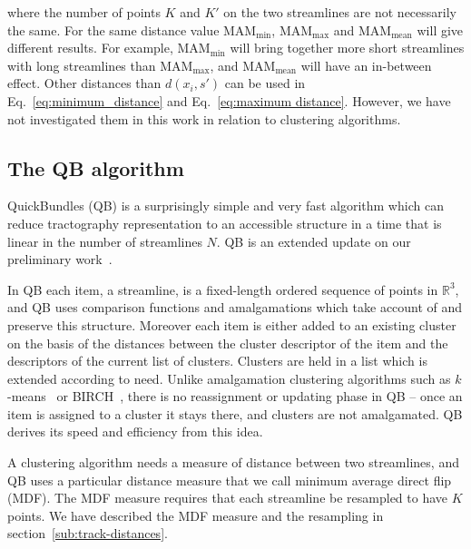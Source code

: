 \documentclass{bioinfo}
\begin{document}
\begin{methods}
\noindent
where the number of points $K$ and $K'$ on the two streamlines are not
necessarily the same. For the same distance value
$\textrm{MAM}_{\textrm{min}}$, $\textrm{MAM}_{\textrm{max}}$ and
$\textrm{MAM}_{\textrm{mean}}$ will give different results. For example,
$\textrm{MAM}_{\textrm{min}}$ will bring together more short streamlines
with long streamlines than $\textrm{MAM}_{\textrm{max}}$, and
$\textrm{MAM}_{\textrm{mean}}$ will have an in-between effect.  Other
distances than $d(x_{i},s')$ can be used in
Eq.~\ref{eq:minimum_distance} and Eq.~\ref{eq:maximum distance}.
However, we have not investigated them in this work in relation to
clustering algorithms.

\subsection{The QB algorithm\label{sub:QB-description}}

QuickBundles (QB) is a surprisingly simple and very fast algorithm which
can reduce tractography representation to an accessible structure in a
time that is linear in the number of streamlines $N$. QB is an extended
update on our preliminary work~\citet{EGMB10}.

In QB each item, a streamline, is a fixed-length ordered sequence of
points in $\mathbb{R}^{3}$, and QB uses comparison functions and
amalgamations which take account of and preserve this structure.
Moreover each item is either added to an existing cluster on the basis
of the distances between the cluster descriptor of the item and the
descriptors of the current list of clusters. Clusters are held in a list
which is extended according to need. Unlike amalgamation clustering
algorithms such as $k$-means~\citep{steinhaus1956division,
  macqueen1967some} or BIRCH~\citep{zhang1997birch}, there is no
reassignment or updating phase in QB -- once an item is assigned to a
cluster it stays there, and clusters are not amalgamated. QB derives its
speed and efficiency from this idea.

A clustering algorithm needs a measure of distance between two
streamlines, and QB uses a particular distance measure that we call
minimum average direct flip (MDF).  The MDF measure requires that each
streamline be resampled to have $K$ points. We have described the MDF measure
and the resampling in section~\ref{sub:track-distances}.


\end{methods}
\end{document}
